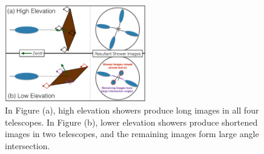 \begin{figure}[!t]
  \centering
  \includegraphics[width=0.55\textwidth]{images/high_elevation_vs_low_shower_images_cropped.eps}
  \caption[Shower Images at High and Low Elevations]{
    In Figure (a), high elevation showers produce long images in all four telescopes.
    In Figure (b), lower elevation showers produce shortened images in two telescopes, and the remaining images form large angle intersection.
  }
  \label{fig:showerhighlowelev}
\end{figure}

